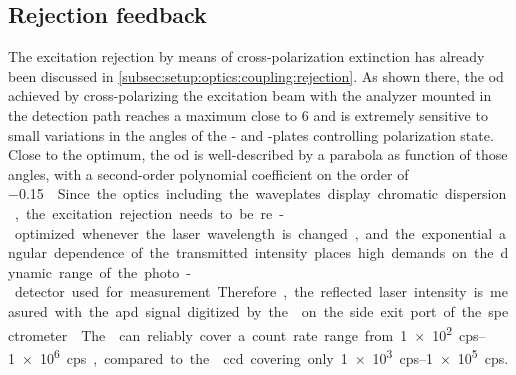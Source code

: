 \subsection{Rejection feedback}\label{subsec:sec:exp:mjolnir:calibration:rejection}
The excitation rejection by means of cross-polarization extinction has already been discussed in \cref{subsec:setup:optics:coupling:rejection}.
As shown there, the \gls{od} achieved by cross-polarizing the excitation beam with the analyzer mounted in the detection path reaches a maximum close to \num{6} and is extremely sensitive to small variations in the angles of the \quarterwave- and \halfwave-plates controlling polarization state.
Close to the optimum, the \gls{od} is well-described by a parabola as function of those angles, with a second-order polynomial coefficient on the order of \qty[per-mode = symbol]{-0.15}{\per\square\milli\txtdegree}.
Since the optics including the waveplates display chromatic dispersion, the excitation rejection needs to be re-optimized whenever the laser wavelength is changed, and the exponential angular dependence of the transmitted intensity places high demands on the dynamic range of the photo-detector used for measurement.
Therefore, the reflected laser intensity is measured with the \gls{apd} signal digitized by the \tagger on the side exit port of the spectrometer.
The \taggershort can reliably cover a count rate range from \qtyrange{1e2}{1e6}{cps}, compared to the \theccd \gls{ccd} covering only \qtyrange{1e3}{1e5}{cps}.

